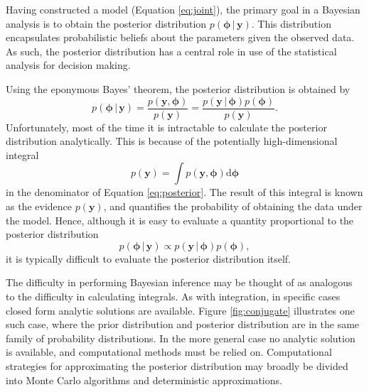 \documentclass[a4paper, nobind]{templates/ociamthesis}
\begin{document}
Having constructed a model (Equation \eqref{eq:joint}), the primary goal in a Bayesian analysis is to obtain the posterior distribution \(p(\boldsymbol{\mathbf{\phi}} \, | \, \mathbf{y})\).
This distribution encapsulates probabilistic beliefs about the parameters given the observed data.
As such, the posterior distribution has a central role in use of the statistical analysis for decision making.

Using the eponymous Bayes' theorem, the posterior distribution is obtained by
\begin{equation}
p(\boldsymbol{\mathbf{\phi}} \, | \, \mathbf{y}) = \frac{p(\mathbf{y}, \boldsymbol{\mathbf{\phi}})}{p(\mathbf{y})} = \frac{p(\mathbf{y} \, | \, \boldsymbol{\mathbf{\phi}}) p(\boldsymbol{\mathbf{\phi}})}{p(\mathbf{y})}. \label{eq:posterior}
\end{equation}
Unfortunately, most of the time it is intractable to calculate the posterior distribution analytically.
This is because of the potentially high-dimensional integral
\begin{equation}
p(\mathbf{y}) = \int p(\mathbf{y}, \boldsymbol{\mathbf{\phi}}) \text{d}\boldsymbol{\mathbf{\phi}}
\end{equation}
in the denominator of Equation \eqref{eq:posterior}.
The result of this integral is known as the evidence \(p(\mathbf{y})\), and quantifies the probability of obtaining the data under the model.
Hence, although it is easy to evaluate a quantity proportional to the posterior distribution
\begin{equation}
p(\boldsymbol{\mathbf{\phi}} \, | \, \mathbf{y}) \propto p(\mathbf{y} \, | \, \boldsymbol{\mathbf{\phi}}) p(\boldsymbol{\mathbf{\phi}}),
\end{equation}
it is typically difficult to evaluate the posterior distribution itself.

The difficulty in performing Bayesian inference may be thought of as analogous to the difficulty in calculating integrals.
As with integration, in specific cases closed form analytic solutions are available.
Figure \ref{fig:conjugate} illustrates one such case, where the prior distribution and posterior distribution are in the same family of probability distributions.
In the more general case no analytic solution is available, and computational methods must be relied on.
Computational strategies for approximating the posterior distribution \autocite{martin2023computing} may broadly be divided into Monte Carlo algorithms and deterministic approximations.
\end{document}
